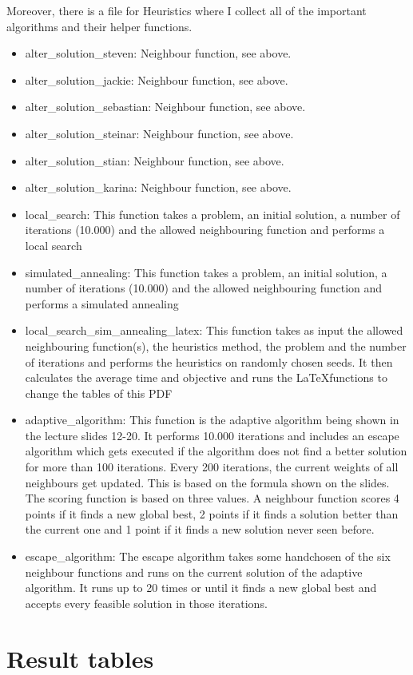 \documentclass[a4paper,11pt]{article}
\theoremstyle{mytheor}
\begin{document}
\clearpage
Moreover, there is a file for Heuristics where I collect all of the important algorithms and their helper functions.
\begin{itemize}
\item alter\_solution\_steven: Neighbour function, see above.
\item alter\_solution\_jackie: Neighbour function, see above.
\item alter\_solution\_sebastian: Neighbour function, see above.
\item alter\_solution\_steinar: Neighbour function, see above.
\item alter\_solution\_stian: Neighbour function, see above.
\item alter\_solution\_karina: Neighbour function, see above.


\item local\_search: This function takes a problem, an initial solution, a number of iterations (10.000) and the allowed neighbouring function and performs a local search
\item simulated\_annealing: This function takes a problem, an initial solution, a number of iterations (10.000) and the allowed neighbouring function and performs a simulated annealing
\item local\_search\_sim\_annealing\_latex: This function takes as input the allowed neighbouring function(s), the heuristics method, the problem and the number of iterations and performs the heuristics on randomly chosen seeds. It then calculates the average time and objective and runs the \LaTeX functions to change the tables of this PDF
\item adaptive\_algorithm: This function is the adaptive algorithm being shown in the lecture slides 12-20. It performs 10.000 iterations and includes an escape algorithm which gets executed if the algorithm does not find a better solution for more than 100 iterations. Every 200 iterations, the current weights of all neighbours get updated. This is based on the formula shown on the slides. The scoring function is based on three values. A neighbour function scores 4 points if it finds a new global best, 2 points if it finds a solution better than the current one and 1 point if it finds a new solution never seen before.
\item escape\_algorithm: The escape algorithm takes some handchosen of the six neighbour functions and runs on the current solution of the adaptive algorithm. It runs up to 20 times or until it finds a new global best and accepts every feasible solution in those iterations.
\end{itemize}

\clearpage

\section{Result tables}

\end{document}
